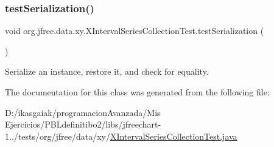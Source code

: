 \subsubsection{\texorpdfstring{test\+Serialization()}{testSerialization()}}
{\footnotesize\ttfamily void org.\+jfree.\+data.\+xy.\+X\+Interval\+Series\+Collection\+Test.\+test\+Serialization (\begin{DoxyParamCaption}{ }\end{DoxyParamCaption})}

Serialize an instance, restore it, and check for equality. 

The documentation for this class was generated from the following file\+:\begin{DoxyCompactItemize}
\item 
D\+:/ikasgaiak/programacion\+Avanzada/\+Mis Ejercicios/\+P\+B\+Ldefinitibo2/libs/jfreechart-\/1../tests/org/jfree/data/xy/\mbox{\hyperlink{_x_interval_series_collection_test_8java}{X\+Interval\+Series\+Collection\+Test.\+java}}\end{DoxyCompactItemize}
